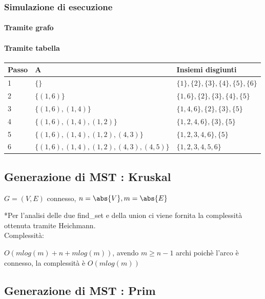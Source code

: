 \subsubsection{Simulazione di esecuzione}

\paragraph{Tramite grafo}



\paragraph{Tramite tabella}

\begin{tabular}{|l|l|l|}
\hline 
Passo & A & Insiemi disgiunti \\ 
\hline 
1 & $\{\}$ & $\{1\},\{2\},\{3\},\{4\},\{5\},\{6\}$ \\ 
\hline 
2 & $\{(1,6)\}$ & $\{1,6\},\{2\},\{3\},\{4\},\{5\}$ \\ 
\hline 
3 & $\{(1,6),(1,4)\}$ & $\{1,4,6\},\{2\},\{3\},\{5\}$ \\ 
\hline 
4 & $\{(1,6),(1,4),(1,2)\}$ & $\{1,2,4,6\},\{3\},\{5\}$ \\ 
\hline 
5 & $\{(1,6),(1,4),(1,2),(4,3)\}$ & $\{1,2,3,4,6\},\{5\}$ \\ 
\hline 
6 & $\{(1,6),(1,4),(1,2),(4,3),(4,5)\}$ & $\{1,2,3,4,5,6\}$ \\ 
\hline 
\end{tabular} 

\subsection{Generazione di MST : Kruskal}

$G=(V,E)$ connesso, $n=\abs{V},m=\abs{E}$



{*Per l'analisi delle due find\_set e della union ci viene fornita la complessità ottenuta tramite Heichmann.\\
}{Complessità}{:}

{$O(mlog(m)+n+mlog(m))$, avendo $m \geq n-1$ archi poichè l'arco è connesso, la complessità è $O(mlog(m))$}


\subsection{Generazione di MST : Prim}

